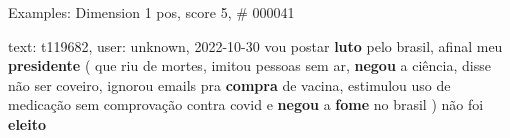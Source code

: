 \begin{frame}{Examples: Dimension 1 pos, score 5, \# 000041}
\footnotesize
\begin{exampleblock}{text: t119682, user: unknown, 2022-10-30}
vou postar \textbf{luto} pelo brasil, afinal meu \textbf{presidente} ( que riu 
de mortes, imitou pessoas sem ar, \textbf{negou} a ciência, disse não ser 
coveiro, ignorou emails pra \textbf{compra} de vacina, estimulou uso de 
medicação sem comprovação contra covid e \textbf{negou} a \textbf{fome} no 
brasil ) não foi \textbf{eleito} 
\end{exampleblock}
\end{frame}
